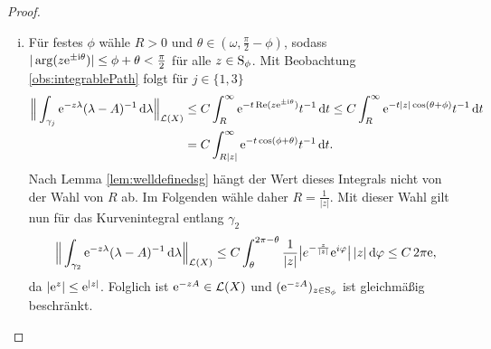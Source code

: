 \begin{proof}
  \begin{enumerate}[(i)]
    \item Für festes $\phi$ wähle $R > 0$ und $\theta \in (\omega, \frac{\pi}{2} - \phi)$, sodass  $|\arg(z \mathrm{e}^{\pm \mathrm{i}\theta})| \leq \phi + \theta < \frac{\pi}{2}$ für alle $z \in \mathrm{S}_\phi$.
      Mit Beobachtung \ref{obs:integrablePath} folgt für $j \in \{1,3\}$
      \begin{align*}
        \Big\| \int_{\gamma_{j}} \mathrm{e}^{-z \lambda} (\lambda - A)^{-1} \, {\operatorname{d}\!{\lambda}} \Big\|_{\mathcal{L}(X)} 
        &\leq C\int_R^\infty \mathrm{e}^{-t \operatorname{Re}(z \mathrm{e}^{\pm \mathrm{i}\theta})} t^{-1} \, {\operatorname{d}\!{t}}
        \leq C \int_R^\infty \mathrm{e}^{-t |z| \cos(\theta + \phi)} t^{-1} \, {\operatorname{d}\!{t}} \\
        &= C \int_{R|z|}^\infty \mathrm{e}^{-t \cos(\phi+\theta)} t^{-1} \, {\operatorname{d}\!{t}}.
      \end{align*}
      Nach Lemma \ref{lem:welldefinedsg} hängt der Wert dieses Integrals nicht von der Wahl von $R$ ab. 
      Im Folgenden wähle daher $R = \frac{1}{|z|}$.
      Mit dieser Wahl gilt nun für das Kurvenintegral entlang $\gamma_2$
      \begin{align*}
        \Big\|\int_{\gamma_2} \mathrm{e}^{-z \lambda} (\lambda - A)^{-1} \, {\operatorname{d}\!{\lambda}} \Big\|_{\mathcal{L}(X)}
        \leq C\int_\theta^{2\pi - \theta} \frac{1}{|z|} \big|e^{-\frac{z}{|z|}} \mathrm{e}^{i \varphi} \big| \, |z| \, {\operatorname{d}\!{\varphi}}
        \leq C \, 2\pi \mathrm{e},
      \end{align*}
      da $|\mathrm{e}^z| \leq \mathrm{e}^{|z|}$.
      Folglich ist $\mathrm{e}^{-z A} \in \mathcal{L}(X)$ und $(\mathrm{e}^{-zA})_{z \in \mathrm{S}_\phi}$ ist gleichmäßig beschränkt.


\end{enumerate}
\end{proof}
